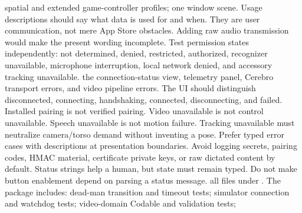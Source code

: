 \markdownRendererUlItem spatial and extended game-controller profiles;\markdownRendererUlItemEnd 
\markdownRendererUlItem one window scene.\markdownRendererUlItemEnd 
\markdownRendererUlEnd \markdownRendererInterblockSeparator
{}Usage descriptions should say what data is used for and when. They are user communication, not mere App Store obstacles. Adding raw audio transmission would make the present wording incomplete.\markdownRendererParagraphSeparator
{}Test permission states independently: not determined, denied, restricted, authorized, recognizer unavailable, microphone interruption, local network denied, and accessory tracking unavailable.\markdownRendererInterblockSeparator
{}
\markdownRendererSectionEnd \markdownRendererSectionBegin
{}\markdownRendererInterblockSeparator
{}\markdownRendererBlockQuoteBegin
{} the connection-status view, telemetry panel, Cerebro transport errors, and video pipeline errors.\markdownRendererBlockQuoteEnd \markdownRendererInterblockSeparator
{}The UI should distinguish disconnected, connecting, handshaking, connected, disconnecting, and failed. Installed pairing is not verified pairing. Video unavailable is not control unavailable. Speech unavailable is not motion failure. Tracking unavailable must neutralize camera/torso demand without inventing a pose.\markdownRendererParagraphSeparator
{}Prefer typed error cases with  descriptions at presentation boundaries. Avoid logging secrets, pairing codes, HMAC material, certificate private keys, or raw dictated content by default.\markdownRendererParagraphSeparator
{}Status strings help a human, but state must remain typed. Do not make button enablement depend on parsing a status message.\markdownRendererInterblockSeparator
{}
\markdownRendererSectionEnd \markdownRendererSectionBegin
{}\markdownRendererInterblockSeparator
{}\markdownRendererBlockQuoteBegin
{} all files under .\markdownRendererBlockQuoteEnd \markdownRendererInterblockSeparator
{}The package includes:\markdownRendererInterblockSeparator
{}\markdownRendererUlBegin
\markdownRendererUlItem dead-man transition and timeout tests;\markdownRendererUlItemEnd 
\markdownRendererUlItem simulator connection and watchdog tests;\markdownRendererUlItemEnd 
\markdownRendererUlItem video-domain Codable and validation tests;\markdownRendererUlItemEnd 
